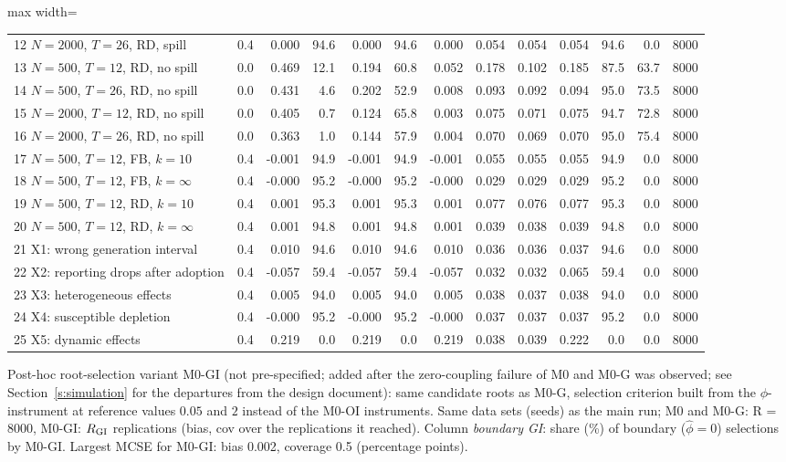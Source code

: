 \begin{table}[!t]
\begin{adjustbox}{max width=\linewidth}
\begin{tabular}{lrrrrrrrrrrrr}
12 $N=2000$, $T=26$, RD, spill & 0.4 & 0.000 & 94.6 & 0.000 & 94.6 & 0.000 & 0.054 & 0.054 & 0.054 & 94.6 & 0.0 & 8000 \\
13 $N=500$, $T=12$, RD, no spill & 0.0 & 0.469 & 12.1 & 0.194 & 60.8 & 0.052 & 0.178 & 0.102 & 0.185 & 87.5 & 63.7 & 8000 \\
14 $N=500$, $T=26$, RD, no spill & 0.0 & 0.431 & 4.6 & 0.202 & 52.9 & 0.008 & 0.093 & 0.092 & 0.094 & 95.0 & 73.5 & 8000 \\
15 $N=2000$, $T=12$, RD, no spill & 0.0 & 0.405 & 0.7 & 0.124 & 65.8 & 0.003 & 0.075 & 0.071 & 0.075 & 94.7 & 72.8 & 8000 \\
16 $N=2000$, $T=26$, RD, no spill & 0.0 & 0.363 & 1.0 & 0.144 & 57.9 & 0.004 & 0.070 & 0.069 & 0.070 & 95.0 & 75.4 & 8000 \\
17 $N=500$, $T=12$, FB, $k=10$ & 0.4 & -0.001 & 94.9 & -0.001 & 94.9 & -0.001 & 0.055 & 0.055 & 0.055 & 94.9 & 0.0 & 8000 \\
18 $N=500$, $T=12$, FB, $k=\infty$ & 0.4 & -0.000 & 95.2 & -0.000 & 95.2 & -0.000 & 0.029 & 0.029 & 0.029 & 95.2 & 0.0 & 8000 \\
19 $N=500$, $T=12$, RD, $k=10$ & 0.4 & 0.001 & 95.3 & 0.001 & 95.3 & 0.001 & 0.077 & 0.076 & 0.077 & 95.3 & 0.0 & 8000 \\
20 $N=500$, $T=12$, RD, $k=\infty$ & 0.4 & 0.001 & 94.8 & 0.001 & 94.8 & 0.001 & 0.039 & 0.038 & 0.039 & 94.8 & 0.0 & 8000 \\
21 X1: wrong generation interval & 0.4 & 0.010 & 94.6 & 0.010 & 94.6 & 0.010 & 0.036 & 0.036 & 0.037 & 94.6 & 0.0 & 8000 \\
22 X2: reporting drops after adoption & 0.4 & -0.057 & 59.4 & -0.057 & 59.4 & -0.057 & 0.032 & 0.032 & 0.065 & 59.4 & 0.0 & 8000 \\
23 X3: heterogeneous effects & 0.4 & 0.005 & 94.0 & 0.005 & 94.0 & 0.005 & 0.038 & 0.037 & 0.038 & 94.0 & 0.0 & 8000 \\
24 X4: susceptible depletion & 0.4 & -0.000 & 95.2 & -0.000 & 95.2 & -0.000 & 0.037 & 0.037 & 0.037 & 95.2 & 0.0 & 8000 \\
25 X5: dynamic effects & 0.4 & 0.219 & 0.0 & 0.219 & 0.0 & 0.219 & 0.038 & 0.039 & 0.222 & 0.0 & 0.0 & 8000 \\
\bottomrule
\end{tabular}
\end{adjustbox}
\par\smallskip\parbox{\linewidth}{\scriptsize Post-hoc root-selection variant M0-GI (not pre-specified; added after the zero-coupling failure of M0 and M0-G was observed; see Section~\ref{s:simulation} for the departures from the design document): same candidate roots as M0-G, selection criterion built from the $\phi$-instrument at reference values $0.05$ and $2$ instead of the M0-OI instruments. Same data sets (seeds) as the main run; M0 and M0-G: R = 8000, M0-GI: $R_{\rm GI}$ replications (bias, cov over the replications it reached). Column \emph{boundary GI}: share (\%) of boundary ($\hat\phi=0$) selections by M0-GI. Largest MCSE for M0-GI: bias 0.002, coverage 0.5 (percentage points).}
\end{table}
